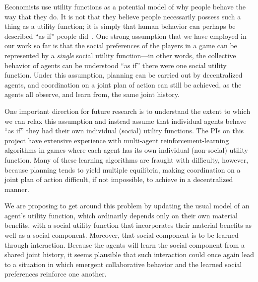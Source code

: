 Economists use utility functions as a potential model of why people
behave the way that they do.  It is not that they believe people
necessarily possess such a thing as a utility function; it is simply
that human behavior can perhaps be described ``as if'' people
did~\cite{Savage1954}.  One strong assumption that we have employed in
our work so far is that the social preferences of the players in a
game can be represented by a \emph{single\/} social utility
function---in other words, the collective behavior of agents can be
understood ``as if'' there were one social utility function.  Under
this assumption, planning can be carried out by decentralized agents,
and coordination on a joint plan of action can still be achieved, as
the agents all observe, and learn from, the same joint history.

One important direction for future research is to understand the
extent to which we can relax this assumption and instead assume that
individual agents behave ``as if'' they had their own individual
(social) utility functions.  The PIs on this project have extensive
experience with multi-agent reinforcement-learning algorithms in games
where each agent has its own individual (non-social) utility function.
Many of these learning algorithms are fraught with difficulty,
however, because planning tends to yield multiple equilibria, making
coordination on a joint plan of action difficult, if not impossible,
to achieve in a decentralized manner.

We are proposing to get around this problem by updating the usual
model of an agent's utility function, which ordinarily depends only on
their own material benefits, with a social utility function that
incorporates their material benefits as well as a social component.
Moreover, that social component is to be learned through interaction.
Because the agents will learn the social component from a shared joint
history, it seems plausible that such interaction could once again
lead to a situation in which emergent collaborative behavior and the
learned social preferences reinforce one another.


